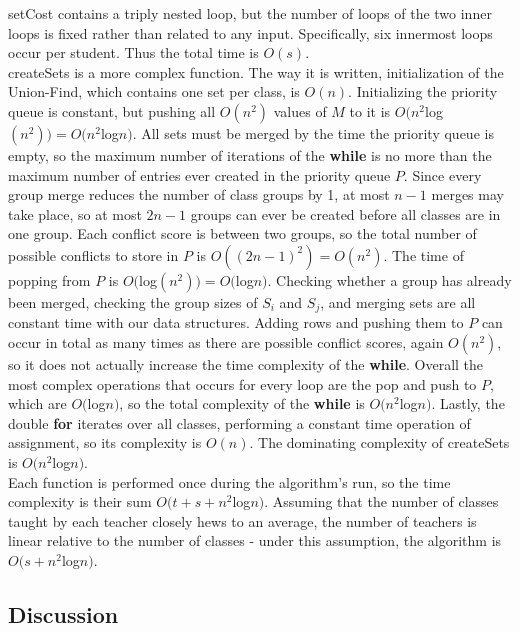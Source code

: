 \documentclass[11pt, oneside]{article}   	%
\begin{document}
 setCost contains a triply nested loop, but the number of loops of the two inner loops is fixed rather than related to any input. Specifically, six innermost loops occur per student. Thus the total time is $O(s)$. \\

 createSets is a more complex function. The way it is written, initialization of the Union-Find, which contains one set per class, is $O(n)$. Initializing the priority queue is constant, but pushing all $O(n^2)$ values of $M$ to it is $O(n^2$log$(n^2)) = O(n^2$log$n)$. All sets must be merged by the time the priority queue is empty, so the maximum number of iterations of the \textbf{while} is no more than the maximum number of entries ever created in the priority queue $P$. Since every group merge reduces the number of class groups by 1, at most $n-1$ merges may take place, so at most $2n-1$ groups can ever be created before all classes are in one group. Each conflict score is between two groups, so the total number of possible conflicts to store in $P$ is $O((2n-1)^2) = O(n^2)$. The time of popping from $P$ is $O($log$(n^2)) = O($log$n)$. Checking whether a group has already been merged, checking the group sizes of $S_i$ and $S_j$, and merging sets are all constant time with our data structures. Adding rows and pushing them to $P$ can occur in total as many times as there are possible conflict scores, again $O(n^2)$, so it does not actually increase the time complexity of the \textbf{while}. Overall the most complex operations that occurs for every loop are the pop and push to $P$, which are $O($log$n)$, so the total complexity of the \textbf{while} is $O(n^2$log$n)$. Lastly, the double \textbf{for} iterates over all classes, performing a constant time operation of assignment, so its complexity is $O(n)$. The dominating complexity of createSets is $O(n^2$log$n)$. \\

 Each function is performed once during the algorithm's run, so the time complexity is their sum $O(t+s+n^2$log$n)$. Assuming that the number of classes taught by each teacher closely hews to an average, the number of teachers is linear relative to the number of classes - under this assumption, the algorithm is $O(s + n^2$log$n)$. \\

\subsection{Discussion}
\end{document}
